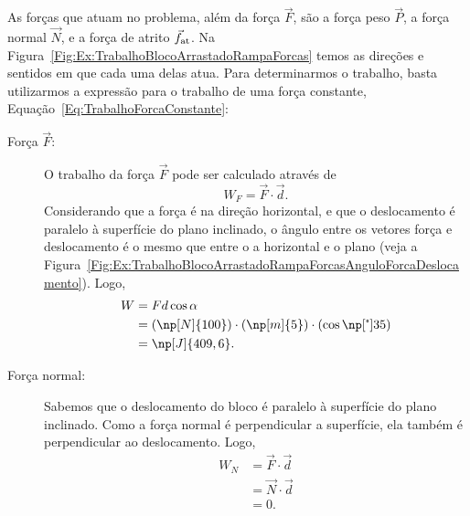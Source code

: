 As forças que atuam no problema, além da força $\vec{F}$, são a força peso $\vec{P}$, a força normal $\vec{N}$, e a força de atrito $\vec{f}_{\rm{at}}$. Na Figura~\ref{Fig:Ex:TrabalhoBlocoArrastadoRampaForcas} temos as direções e sentidos em que cada uma delas atua. Para determinarmos o trabalho, basta utilizarmos a expressão para o trabalho de uma força constante, Equação~\ref{Eq:TrabalhoForcaConstante}:
\begin{description}

    \item[Força $\vec{F}$:] O trabalho da força $\vec{F}$ pode ser calculado através de
    \begin{equation}
        W_F = \vec{F}\cdot\vec{d}.
    \end{equation}
    Considerando que a força é na direção horizontal, e que o deslocamento é paralelo à superfície do plano inclinado, o ângulo entre os vetores força e deslocamento é o mesmo que entre o a horizontal e o plano (veja a Figura~\ref{Fig:Ex:TrabalhoBlocoArrastadoRampaForcasAnguloForcaDeslocamento}). Logo,
    \begin{align}
        W &= Fd\cos\alpha \\
        &= (\np[N]{100})\cdot(\np[m]{5})\cdot(\cos\degree{35}) \\
        &= \np[J]{409,6}.
    \end{align}
    
    \item[Força normal:] Sabemos que o deslocamento do bloco é paralelo à superfície do plano inclinado. Como a força normal é perpendicular a superfície, ela também é perpendicular ao deslocamento. Logo,
    \begin{align}
        W_N &= \vec{F}\cdot\vec{d} \\
        &= \vec{N}\cdot\vec{d} \\
        &=0.
    \end{align}
    
\begin{marginfigure}
\centering
{}
\end{marginfigure}
\end{description}

